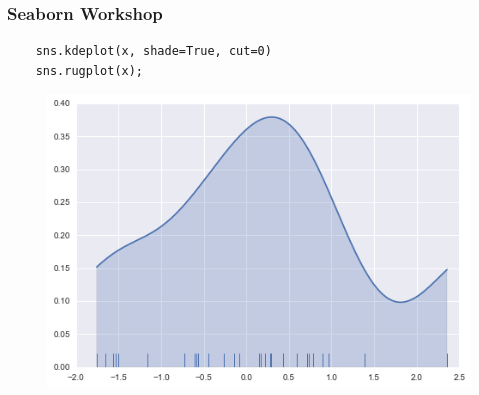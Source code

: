 \documentclass{beamer}
\begin{document}
\begin{frame}[fragile]
	\frametitle{Seaborn Workshop}
	\begin{verbatim}
	sns.kdeplot(x, shade=True, cut=0)
	sns.rugplot(x);
	\end{verbatim}
	
	\begin{figure}
		\centering
		\includegraphics[width=0.7\linewidth]{images/distributions_24_0}
	\end{figure}
\end{frame}
\end{document}
